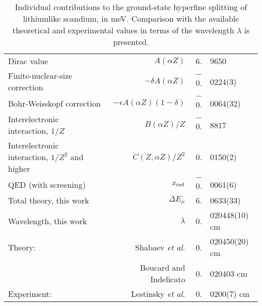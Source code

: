 \documentclass[preprint,aps,pra,showpacs,floatfix]{revtex4}
\newcommand{\eps}{\epsilon}
\newcommand{\aZ}{\alpha Z}
\begin{document}
%
\begin{table}
\label{tab:hfs}
\caption{
Individual contributions to the ground-state hyperfine splitting of lithiumlike scandium, in meV.
Comparison with the available theoretical and experimental values in terms of the wavelength
$\lambda$ is presented.
}
\linespread{1}
\begin{center}
\begin{tabular}{lr|r@{}l}
\hline
\hline
Dirac value                                      &$A(\aZ)$                 &   6.&9650     \\
Finite-nuclear-size correction                   &$-\delta A(\aZ)$         &$-$0.&0224(3)  \\
Bohr-Weisskopf correction                        &$-\eps A(\aZ)(1-\delta)$ &$-$0.&0064(32) \\
Interelectronic interaction, $1/Z$               &$B(\aZ)/Z$               &$-$0.&8817     \\
Interelectronic interaction, $1/Z^2$ and higher  &$C(Z,\aZ)/Z^2$           &   0.&0150(2)  \\
QED (with screening)                             &$x_{\rm rad}$            &$-$0.&0061(6)  \\
\hline
Total theory, this work                          &$\Delta E_\mu$           &   6.&0633(33) \\
\hline
Wavelength, this work                            &$\lambda$                &   0.&020448(10) cm \\
Theory: & Shabaev {\it et al.} \cite{shabaev:97}                           &   0.&020450(20) cm \\
        & Boucard and Indelicato \cite{boucard:00}                         &   0.&020403 cm     \\
Experiment: & Lestinsky {\it et al.} \cite{les:HCI}                        &   0.&0200(7) cm \\
\hline
\end{tabular}
\end{center}
\end{table}
%
%
%
%
\end{document}
